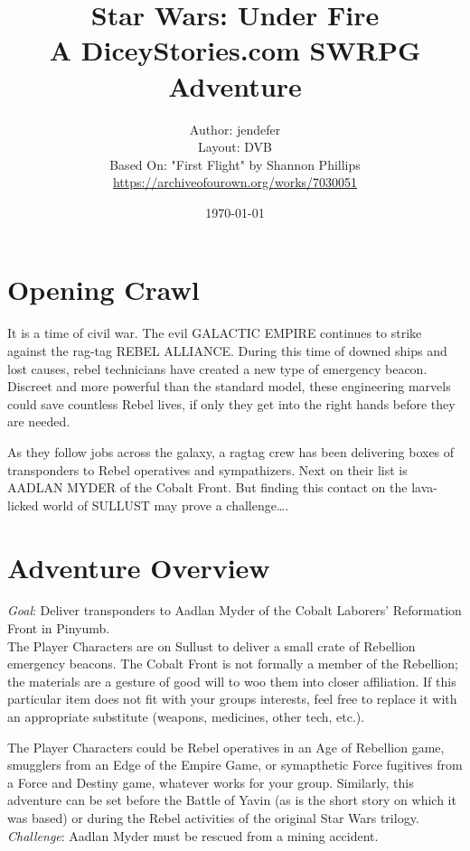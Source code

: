 \documentclass{book}
\title{
Star Wars: Under Fire \\
A DiceyStories.com SWRPG Adventure\\
}
\author{Author: jendefer\\
        Layout: DVB\\
        Based On: "First Flight" by Shannon Phillips \\\url{https://archiveofourown.org/works/7030051}}
\date{\today}
\begin{document}
\maketitle


\begin{multicols}{2}
\section{Opening Crawl}


It is a time of civil war. The evil GALACTIC EMPIRE continues to strike against the rag-tag REBEL ALLIANCE. During this time of downed ships and lost causes, rebel technicians have created a new type of emergency beacon. Discreet and more powerful than the standard model, these engineering marvels could save countless Rebel lives, if only they get into the right hands before they are needed.

As they follow jobs across the galaxy, a ragtag crew has been delivering boxes of transponders to Rebel operatives and sympathizers. Next on their list is AADLAN MYDER of the Cobalt Front. But finding this contact on the lava-licked world of SULLUST may prove a challenge….



\section{Adventure Overview }

\emph{Goal}: Deliver transponders to Aadlan Myder of the Cobalt Laborers’ Reformation Front in Pinyumb.\\
The Player Characters are on Sullust to deliver a small crate of Rebellion emergency beacons. The Cobalt Front is not formally a member of the Rebellion; the materials are a gesture of good will to woo them into closer affiliation. If this particular item does not fit with your groups interests, feel free to replace it with an appropriate substitute (weapons, medicines, other tech, etc.).

The Player Characters could be Rebel operatives in an Age of Rebellion game, smugglers from an Edge of the Empire Game, or symapthetic Force fugitives from a Force and Destiny game, whatever works for your group. Similarly, this adventure can be set before the Battle of Yavin (as is the short story on which it was based) or during the Rebel activities of the original Star Wars trilogy.
\emph{Challenge}: Aadlan Myder must be rescued from a mining accident.


\end{multicols}
\end{document}
